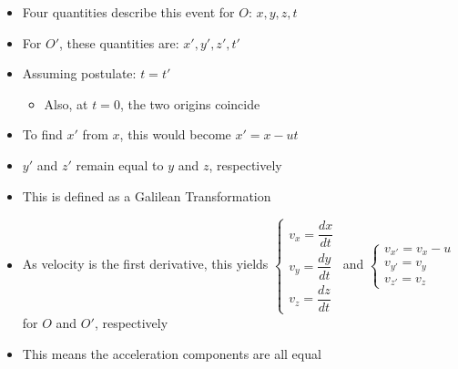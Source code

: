 \begin{itemize}
\begin{itemize}
        \begin{itemize}

          \item Four quantities describe this event for $O$: $x,y,z,t$

          \item For $O'$, these quantities are: $x',y',z',t'$

          \item Assuming postulate: $t=t'$

            \begin{itemize}

              \item Also, at $t=0$, the two origins coincide

            \end{itemize}

          \item To find $x'$ from $x$, this would become $x'= x - ut$

          \item $y'$ and $z'$ remain equal to $y$ and $z$, respectively

          \item This is defined as a Galilean Transformation

          \item As velocity is the first derivative, this yields $\left\{\begin{array}{c} v_x = \dfrac{dx}{dt}\\v_y = \dfrac{dy}{dt}\\ v_z=\dfrac{dz}{dt}\end{array}$ and $\left\{\begin{array}{c} v_{x'} = v_x-u\\v_{y'} = v_y\\ v_{z'}=v_z\end{array}$ for $O$ and $O'$, respectively

                \vspace{10pt}

          \item This means the acceleration components are all equal

        \end{itemize}

    \end{itemize}

\end{itemize}



